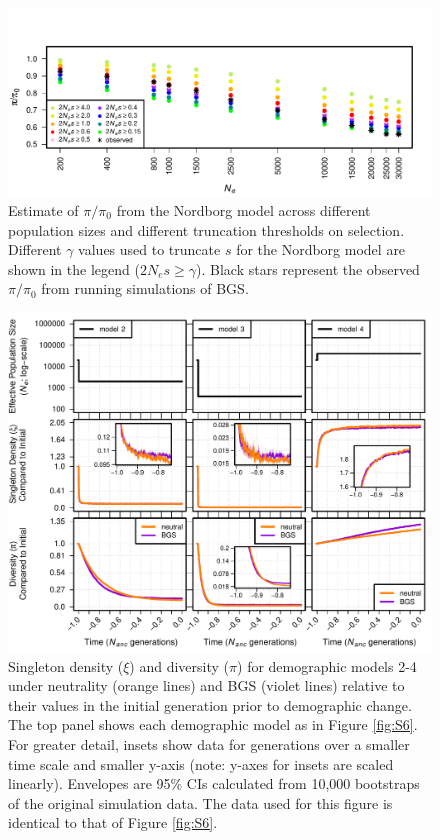 \documentclass[9pt,twocolumn,twoside]{rilabRxiv}
\begin{document}
\begin{figure}[t]
\includegraphics[width=.9\linewidth]{figures/FigS21.pdf}
\caption{Estimate of $\pi/\pi_0$ from the Nordborg model across different population sizes and different truncation thresholds on selection.
Different $\gamma$ values used to truncate $s$ for the Nordborg model are shown in the legend ($2N_es \geq \gamma$).
Black stars represent the observed $\pi/\pi_0$ from running simulations of BGS.}
\label{fig:nordborgsims}
\end{figure}
\pagebreak

\begin{figure}[t]
\includegraphics[width=.9\linewidth]{figures/FigS9.pdf}
\caption{Singleton density ($\xi$) and diversity ($\pi$) for demographic models 2-4 under neutrality (orange lines) and BGS (violet lines) relative to their values in the initial generation prior to demographic change.
The top panel shows each demographic model as in Figure \ref{fig:S6}.
For greater detail, insets show data for generations over a smaller time scale and smaller y-axis (note: y-axes for insets are scaled linearly).
Envelopes are 95\% CIs calculated from 10,000 bootstraps of the original simulation data.
The data used for this figure is identical to that of Figure \ref{fig:S6}.}
\label{fig:S9}
\end{figure}
\pagebreak
\end{document}
